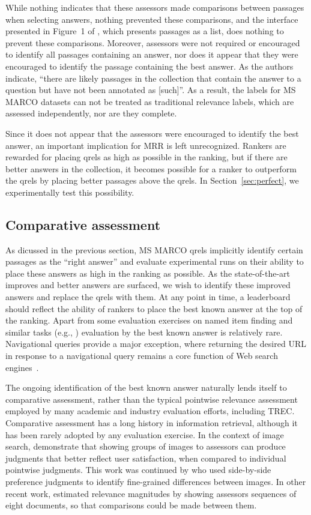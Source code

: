 \documentclass[fullpage]{article}
\begin{document}
While nothing indicates that these assessors made comparisons between passages when selecting answers, nothing prevented these comparisons, and the interface presented in Figure~1 of \citet{nguyen2016ms}, which presents passages as a list, does nothing to prevent these comparisons. Moreover, assessors were not required or encouraged to identify all passages containing an answer, nor does it appear that they were encouraged to identify the passage containing the best answer. As the authors indicate, ``there are likely passages in the collection that contain the answer to a question but have not been annotated as [such]''. As a result, the labels for MS MARCO datasets can not be treated as traditional relevance labels, which are assessed independently, nor are they complete.

Since it does not appear that the assessors were encouraged to identify the best answer, an important implication for MRR is left unrecognized. Rankers are rewarded for placing qrels as high as possible in the ranking, but if there are better answers in the collection, it becomes possible for a ranker to outperform the qrels by placing better passages above the qrels. In Section~\ref{sec:perfect}, we experimentally test this possibility.

\subsection{Comparative assessment}

As dicussed in the previous section, MS MARCO qrels implicitly identify certain passages as the ``right answer'' and evaluate experimental runs on their ability to place these answers as high in the ranking as possible. As the state-of-the-art improves and better answers are surfaced, we wish to identify these improved answers and replace the qrels with them. At any point in time, a leaderboard should reflect the ability of rankers to place the best known answer at the top of the ranking. Apart from some evaluation exercises on named item finding and similar tasks (e.g., \citet{msc06}) evaluation by the best known answer is relatively rare. Navigational queries provide a major exception, where returning the desired URL in response to a navigational query remains a core function of Web search engines~\cite{Broder02}.

The ongoing identification of the best known answer naturally lends itself to comparative assessment, rather than the typical pointwise relevance assessment employed by many academic and industry evaluation efforts, including TREC. Comparative assessment has a long history in information retrieval, although it has been rarely adopted by any evaluation exercise. In the context of image search, \citet{shao19} demonstrate that showing groups of images to assessors can produce judgments that better reflect user satisfaction, when compared to individual pointwise judgments. This work was continued by \citet{xie20} who used side-by-side preference judgments to identify fine-grained differences between images. In other recent work, \citet{mmst17} estimated relevance magnitudes by showing assessors sequences of eight documents, so that comparisons could be made between them. 
\end{document}
